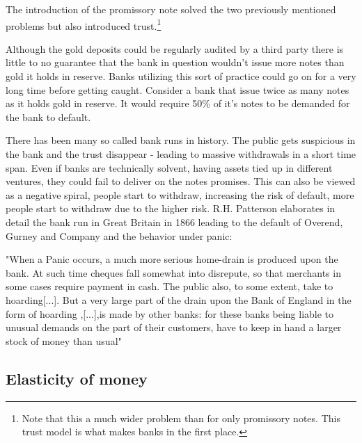 The introduction of the promissory note solved the two previously mentioned problems but also 
introduced trust.\footnote{Note that this a much wider problem than for only promissory notes. This trust model is what makes banks in the first place.} 

Although the gold deposits could be regularly audited by a third party there is little to no guarantee that the bank in question wouldn't issue more notes than gold it holds in reserve. Banks utilizing this sort of practice could go on for a very long time before getting caught. Consider a bank that issue twice as many notes as it holds gold in reserve. It would require 50\% of it's notes to be demanded for the bank to default.  
  
There has been many so called bank runs in history. The public gets suspicious in the bank and the trust disappear - leading to massive withdrawals in a short time span. Even if banks are technically solvent, having assets tied up in different ventures, they could fail to deliver on the notes promises. This can also be viewed as a negative spiral, people start to withdraw, increasing the risk of default, more people start to withdraw due to the higher risk. R.H. Patterson elaborates in detail the bank run in Great Britain in 1866 leading to the default of Overend, Gurney and Company and the behavior under panic: 

\begin{displayquote}
	"When a Panic occurs, a much more serious home-drain is produced upon the bank. At such time cheques fall somewhat into disrepute, so that merchants in some cases require payment in cash. The public also, to some extent, take to hoarding[...]. But a very large part of the drain upon the Bank of England in the form of hoarding ,[...],is made by other banks: for these banks being liable to unusual demands on the part of their customers, have to keep in hand a larger stock of money than usual"\cite{patterson:monetary:drains}
\end{displayquote}

\subsection{Elasticity of money}



